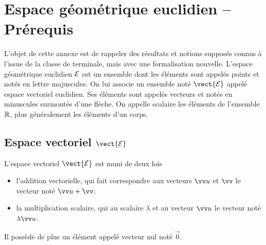 \chapter{Espace géométrique euclidien -- Prérequis}

L'objet de cette annexe est de rappeler des résultats et notions supposés connus à l'issue de la classe de terminale, mais avec une formalisation nouvelle.
L'espace géométrique euclidien $\mathcal{E}$ est un ensemble dont les éléments sont appelés points et notés en lettre majuscules.
On lui associe un ensemble noté $\vect{\E}$ appelé espace vectoriel euclidien. Ses éléments sont appelés vecteurs et notés en minuscules surmontés d'une flèche.
On appelle scalaire les éléments de l'ensemble $\mathbb{R}$, plus généralement les éléments d'un corps.

\section{Espace vectoriel $\protect\vect{\E}$}

L'espace vectoriel $\vect{\E}$ est muni de deux lois
\begin{itemize}
\item l'addition vectorielle, qui fait correspondre aux vecteurs $\vu$ et $\vv$ le vecteur noté $\vu + \vv$;
\item la multiplication scalaire, qui au scalaire $\lambda$ et au vecteur $\vu$ le vecteur noté $\lambda \vu$.
\end{itemize}
 
Il possède de plus un élément appelé vecteur nul noté $\vec{0}$.

